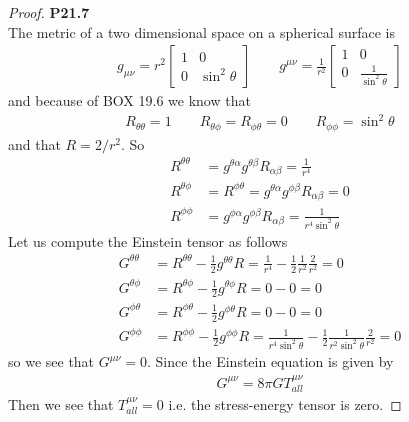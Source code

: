 \documentclass[11pt]{article}
\theoremstyle{definition}
\begin{document}
\cleardoublepage
\begin{proof}{\textbf{P21.7}}\\
The metric of a two dimensional space on a spherical surface is
\begin{align*}
    g_{\mu\nu} = r^2\begin{bmatrix} 1 & 0 \\ 0 & \sin^2\theta \end{bmatrix}
    \qquad
    g^{\mu\nu} = \frac{1}{r^2}
    \begin{bmatrix} 1 & 0 \\ 0 & \frac{1}{\sin^2\theta} \end{bmatrix}
\end{align*}
and because of BOX 19.6 we know that
\begin{align*}
    R_{\theta\theta} = 1 \qquad
    R_{\theta\phi} = R_{\phi\theta} = 0 \qquad
    R_{\phi\phi} = \sin^2\theta
\end{align*}
and that $R = 2/r^2$. So
\begin{align*}
    R^{\theta\theta} &= g^{\theta\alpha}g^{\theta\beta}R_{\alpha\beta}
    = \frac{1}{r^4} \\
    R^{\theta\phi} &= R^{\phi\theta}
    = g^{\theta\alpha}g^{\phi\beta}R_{\alpha\beta} = 0 \\
    R^{\phi\phi} &= g^{\phi\alpha}g^{\phi\beta}R_{\alpha\beta}
    = \frac{1}{r^4\sin^2\theta}
\end{align*}
Let us compute the Einstein tensor as follows
\begin{align*}
    G^{\theta\theta} &= R^{\theta\theta} - \frac{1}{2}g^{\theta\theta} R
    = \frac{1}{r^4} - \frac{1}{2}\frac{1}{r^2}\frac{2}{r^2} = 0 \\
    G^{\theta\phi} &= R^{\theta\phi} - \frac{1}{2}g^{\theta\phi} R
    = 0 - 0 = 0 \\
    G^{\phi\theta} &= R^{\phi\theta} - \frac{1}{2}g^{\phi\theta} R
    = 0 - 0 = 0 \\
    G^{\phi\phi} &= R^{\phi\phi} - \frac{1}{2}g^{\phi\phi} R
    = \frac{1}{r^4\sin^2\theta}
    - \frac{1}{2}\frac{1}{r^2\sin^2\theta}\frac{2}{r^2} = 0
\end{align*}
so we see that $G^{\mu\nu} = 0$. Since the Einstein equation is given by
\begin{align*}
    G^{\mu\nu} = 8\pi G T^{\mu\nu}_{all}
\end{align*}
Then we see that $T^{\mu\nu}_{all} = 0$ i.e. the stress-energy tensor is zero.
\end{proof}
\end{document}
